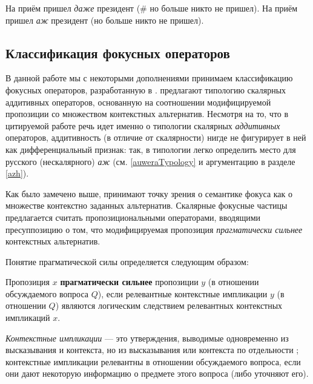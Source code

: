 \documentclass[a4paper, titlepage]{article}
\begin{document}
\begin{exe}
    \ex \label{additiveAndNot} \begin{xlist}
        \ex На приём пришел \textit{даже} президент (\# но больше никто не пришел).
        \ex На приём пришел \textit{аж} президент (но больше никто не пришел).
    \end{xlist}
\end{exe}

\subsection{Классификация фокусных операторов} \label{scalarOperators}

В данной работе мы с некоторыми дополнениями принимаем классификацию фокусных операторов, разработанную в \citep{gast2011scalar}. \citep{gast2011scalar} предлагают типологию скалярных аддитивных операторов, основанную на соотношении модифицируемой пропозиции со множеством контекстных альтернатив. Несмотря на то, что в цитируемой работе речь идет именно о типологии скалярных \textit{аддитивных} операторов, аддитивность (в отличие от скалярности) нигде не фигурирует в ней как дифференциальный признак: так, в типологии \citep{gast2011scalar} легко определить место для русского (нескалярного) \textit{аж} (см. \ref{auweraTypology} и аргументацию в разделе \ref{azh}).

\medskip

Как было замечено выше, \citep{gast2011scalar} принимают точку зрения \citep{rooth1985association} о семантике фокуса как о множестве контекстно заданных альтернатив. Скалярные фокусные частицы предлагается считать пропозициональными операторами, вводящими пресуппозицию о том, что модифицируемая пропозиция \textit{прагматически сильнее} контекстных альтернатив.

\medskip

Понятие прагматической силы определяется следующим образом:

\begin{exe}
    \ex \label{pragmaticStrength} Пропозиция $ x $ \textbf{прагматически сильнее} пропозиции $ y $ (в отношении обсуждаемого вопроса $ Q $), если релевантные контекстные импликации $ y $ (в отношении $ Q $) являются логическим следствием релевантных контекстных импликаций $ x $.
\end{exe}

\textit{Контекстные импликации} --- это утверждения, выводимые одновременно из высказывания и контекста, но из высказывания или контекста по отдельности \citep{sperber2004experimental}; контекстные импликации релевантны в отношении обсуждаемого вопроса, если они дают некоторую информацию о предмете этого вопроса (либо уточняют его). 
\end{document}

